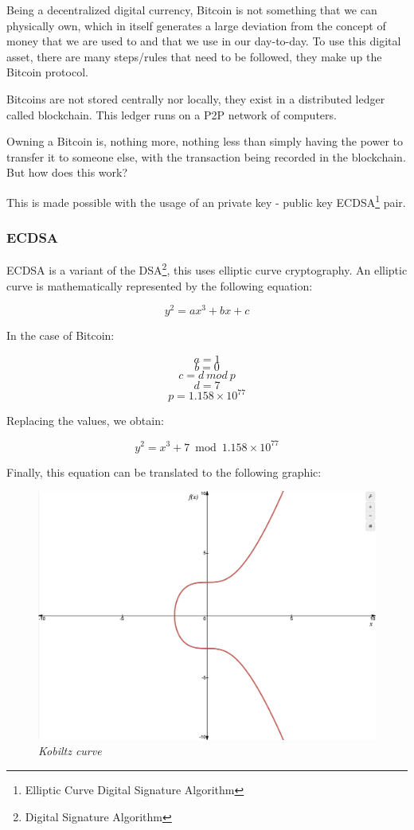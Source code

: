 \documentclass{article}
\newcommand\tab[1][1cm]{\hspace*{#1}}
\begin{document}
\tab Being a decentralized digital currency, Bitcoin is not something that we can physically own, which in itself generates a large deviation from the concept of money that we are used to and that we use in our day-to-day. To use this digital asset, there are many steps/rules that need to be followed, they make up the Bitcoin protocol.

Bitcoins are not stored centrally nor locally, they exist in a distributed ledger called blockchain. This ledger runs on a P2P network of computers. 

Owning a Bitcoin is, nothing more, nothing less than simply having the power to transfer it to someone else, with the transaction being recorded in the blockchain. But how does this work?

This is made possible with the usage of an private key - public key ECDSA\footnote{Elliptic Curve Digital Signature Algorithm} pair.

\subsubsection{ECDSA}

\tab ECDSA is a variant of the DSA\footnote{Digital Signature Algorithm}, this uses elliptic curve cryptography. An elliptic curve is mathematically represented by the following equation:

\[y^2 = ax^3 + bx + c\]

In the case of Bitcoin:

\[a = 1\]
\[b = 0\]
\[c = d\: mod\: p\]
\[d = 7\]
\[p = 1.158 \times 10^{77}\]

Replacing the values, we obtain:

\[y^2 = x^3 + 7 \bmod{1.158 \times 10^{77}}\]

Finally, this equation can be translated to the following graphic:


\begin{figure}[H]
    \begin{center}
        \includegraphics[width=0.5 \textwidth]{images/Kobiltz_curve.png}
        \caption{\textit{Kobiltz curve}}
    \end{center}
\end{figure}
\end{document}
